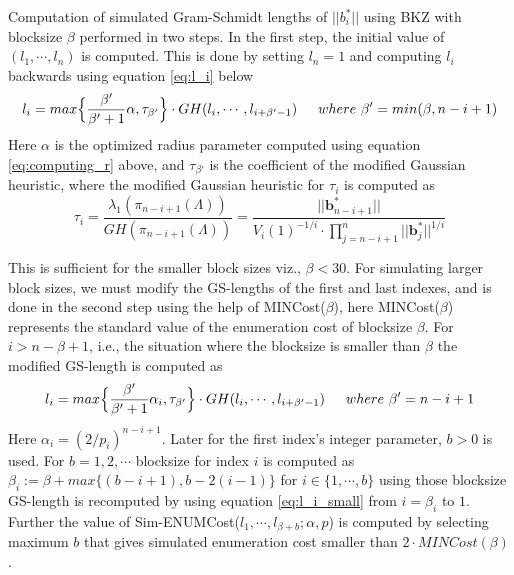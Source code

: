 Computation of simulated Gram-Schmidt lengths of $||b_i^*||$ using BKZ with blocksize $\beta$ performed in two steps.
In the first step, the initial value of $(l_1,\cdots,l_n)$ is computed.
This is done by setting $l_n=1$ and computing $l_i$ backwards using equation \ref{eq:l_i} below
\begin{equation}
    l_i = max \Big\{ \frac{\beta'}{\beta'+1} \alpha, \tau_{\beta'} \Big\} \cdot GH(l_i,\cdots,l_{i+\beta'-1}) \hspace{1.5em} where\ \beta'=min(\beta,n-i+1)
    \label{eq:l_i}
\end{equation}
Here $\alpha$ is the optimized radius parameter computed using equation \ref{eq:computing_r} above, and $\tau_{\beta'}$ is the coefficient of the modified Gaussian heuristic, where the modified Gaussian heuristic for $\tau_i$ is computed as
\begin{equation*}
    \tau_i= \frac{\lambda_1(\pi_{n-i+1}(\Lambda))}{GH(\pi_{n-i+1}(\Lambda))} = \frac{||\pmb{b}^{*}_{n-i+1}||} {V_i(1)^{-1/i} \cdot \prod_{j=n-i+1}^{n}||\pmb{b}^{*}_{j}||^{1/i}}
\end{equation*}


This is sufficient for the smaller block sizes viz., $\beta < 30$.
For simulating larger block sizes, we must modify the GS-lengths of the first and last indexes, and is done in the second step using the help of MINCost($\beta$), here MINCost($\beta$) represents the standard value of the enumeration cost of blocksize $\beta$.
For $i>n-\beta+1$, i.e., the situation where the blocksize is smaller than $\beta$ the modified GS-length is computed as
\begin{equation}
    l_i = max \Big\{ \frac{\beta'}{\beta'+1} \alpha_i, \tau_{\beta'} \Big\} \cdot GH(l_i,\cdots,l_{i+\beta'-1}) \hspace{1.5em} where\ \beta'=n-i+1
    \label{eq:l_i_small}
\end{equation}
Here $\alpha_i=(2/p_i)^{n-i+1}$.
Later for the first index's integer parameter, $b>0$ is used.
For $b=1,2,\cdots$ blocksize for index $i$ is computed as $\beta_i :=\beta+max\{(b-i+1),b-2(i-1)\}$ for $i\in \{1,\cdots,b\}$ using those blocksize GS-length is recomputed by using equation \ref{eq:l_i_small} from $i=\beta_i$ to $1$.
Further the value of Sim-ENUMCost($l_1 ,\cdots, l_{\beta+b}; \alpha, p$) is computed by selecting maximum $b$ that gives simulated enumeration cost smaller than $2 \cdot MINCost(\beta)$.

